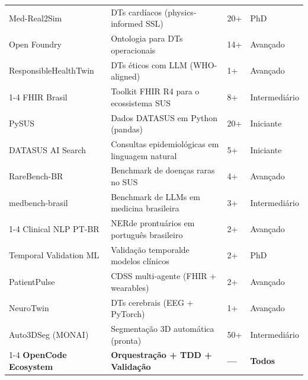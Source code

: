 \begin{longtable}[c]{p{3.5cm}p{5cm}p{2cm}p{3cm}}
Med-Real2Sim & DTs cardíacos (physics-informed SSL) & 20+ & PhD \\
Open Foundry & Ontologia para DTs operacionais & 14+ & Avançado \\
ResponsibleHealthTwin & DTs éticos com LLM (WHO-aligned) & 1+ & Avançado \\
\cmidrule{1-4}
FHIR Brasil & Toolkit FHIR R4 para o ecossistema SUS & 8+ & Intermediário \\
PySUS & Dados DATASUS em Python (pandas) & 20+ & Iniciante \\
DATASUS AI Search & Consultas epidemiológicas em linguagem natural & 5+ & Iniciante \\
RareBench-BR & Benchmark de doenças raras no SUS & 4+ & Avançado \\
medbench-brasil & Benchmark de LLMs em medicina brasileira & 3+ & Intermediário \\
\cmidrule{1-4}
Clinical NLP PT-BR & NER\footnotemark[13] de prontuários em português brasileiro & 2+ & Avançado \\
Temporal Validation ML & Validação temporal\footnotemark[14] de modelos clínicos & 2+ & PhD \\
PatientPulse & CDSS multi-agente (FHIR + wearables) & 2+ & Avançado \\
NeuroTwin & DTs cerebrais (EEG + PyTorch) & 1+ & Avançado \\
Auto3DSeg (MONAI) & Segmentação 3D automática (pronta) & 50+ & Intermediário \\
\cmidrule{1-4}
\textbf{OpenCode Ecosystem} & \textbf{Orquestração + TDD + Validação} & \textbf{---} & \textbf{Todos} \\
\bottomrule
\end{longtable}

\normalsize

